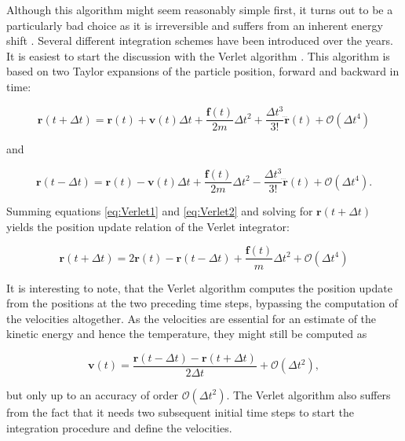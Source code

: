 \documentclass[english, a4paper, 12pt, titlepage, draft]{article}
\newcommand{\vect}[1]{\mathbf{#1}}
\newcommand{\fun}[2]{#1\left(#2\right)}
\newcommand{\vfun}[2]{\vect{#1}\left(#2\right)}
\begin{document}
Although this algorithm might seem reasonably simple first, it turns out to be a particularly bad choice as it is irreversible and suffers from an inherent energy shift \cite{FrenkelSmit}.
Several different integration schemes have been introduced over the years.
It is easiest to start the discussion with the Verlet algorithm \cite{Verlet}.
This algorithm is based on two Taylor expansions of the particle position, forward and backward in time:

\begin{equation}
    \vfun{r}{t+\Delta t} = \vfun{r}{t} + \vfun{v}{t}\Delta t + \frac{\vfun{f}{t}}{2m} \Delta t^2 + \frac{\Delta t^3}{3!} \vfun{\dddot r}{t} + \fun{\mathcal{O}}{\Delta t^4}
    \label{eq:Verlet1}
\end{equation}

and

\begin{equation}
    \vfun{r}{t-\Delta t} = \vfun{r}{t} - \vfun{v}{t}\Delta t + \frac{\vfun{f}{t}}{2m} \Delta t^2 - \frac{\Delta t^3}{3!} \vfun{\dddot r}{t} + \fun{\mathcal{O}}{\Delta t^4}.
    \label{eq:Verlet2}
\end{equation} 

Summing equations \ref{eq:Verlet1} and \ref{eq:Verlet2} and solving for $\vfun{r}{t+\Delta t}$ yields the position update relation of the Verlet integrator:

\begin{equation}
    \vfun{r}{t+\Delta t} = 2\vfun{r}{t} - \vfun{r}{t-\Delta t} + \frac{\vfun{f}{t}}{m} \Delta t^2 + \mathcal{O}(\Delta t^4)
    \label{eq:VerletPos}
\end{equation}

It is interesting to note, that the Verlet algorithm computes the position update from the positions at the two preceding time steps, bypassing the computation of the velocities altogether.
As the velocities are essential for an estimate of the kinetic energy and hence the temperature, they might still be computed as

\begin{equation}
    \vfun{v}{t} = \frac{\vfun{r}{t-\Delta t} - \vfun{r}{t+\Delta t}}{2\Delta t} + \mathcal{O}(\Delta t^2),
\end{equation}

but only up to an accuracy of order $\mathcal{O}(\Delta t^2)$.
The Verlet algorithm also suffers from the fact that it needs two subsequent initial time steps to start the integration procedure and define the velocities.
\end{document}
